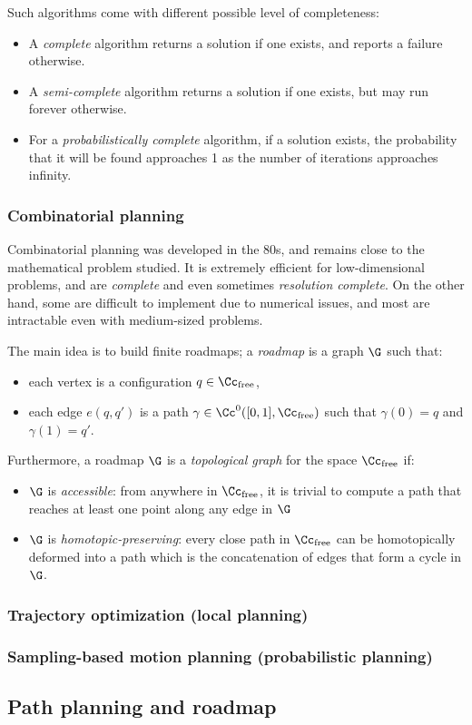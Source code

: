 Such algorithms come with different possible level of completeness:
\begin{itemize}
    \item A \emph{complete} algorithm returns a solution if one exists, and reports a failure otherwise.
    \item A \emph{semi-complete} algorithm returns a solution if one exists, but may run forever otherwise.
    \item For a \emph{probabilistically complete} algorithm, if a solution exists, the probability that it will be found approaches 1 as the number of iterations approaches infinity.
\end{itemize}

\subsubsection{Combinatorial planning}
Combinatorial planning was developed in the 80s, and remains close to the mathematical problem studied. It is extremely efficient for low-dimensional problems, and are \emph{complete} and even sometimes \emph{resolution complete}. On the other hand, some are difficult to implement due to numerical issues, and most are intractable even with medium-sized problems.

The main idea is to build finite roadmaps; a \emph{roadmap} is a graph $\G$ such that:
\begin{itemize}
    \item each vertex is a configuration $q\in\Cc_{\text{free}}$,
    \item each edge $e(q, q')$ is a path $\gamma\in\Cc^0([0,1], \Cc_{\text{free}})$ such that $\gamma(0)=q$ and $\gamma(1)=q'$.
\end{itemize}
Furthermore, a roadmap $\G$ is a \emph{topological graph} for the space $\Cc_{\text{free}}$ if:
\begin{itemize}
    \item $\G$ is \emph{accessible}: from anywhere in $\Cc_{\text{free}}$, it is trivial to compute a path that reaches at least one point along any edge in $\G$
    \item $\G$ is \emph{homotopic-preserving}: every close path in $\Cc_{\text{free}}$ can be homotopically deformed into a path which is the concatenation of edges that form a cycle in $\G$.
\end{itemize}

\subsubsection{Trajectory optimization (local planning)}
\subsubsection{Sampling-based motion planning (probabilistic planning)}

\subsection{Path planning and roadmap}

\newpage